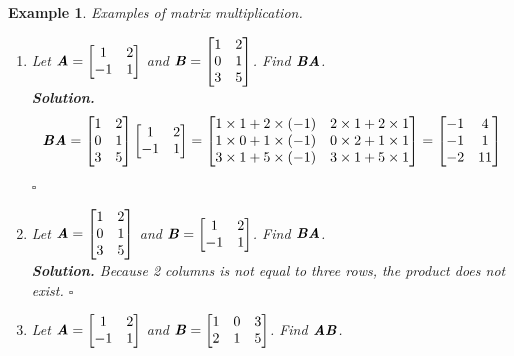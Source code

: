 \documentclass[12pt, a4paper]{article}
\newtheorem{eg}{Example}[subsection]
\newenvironment*{sol}{\indent\textbf{Solution. }}{\hfill{$\square$}\par}
\def\matrixA{\textbf{\emph{A}}}
\def\matrixB{\textbf{\emph{B}}}
\begin{document}
\begin{eg}
Examples of matrix multiplication.
\begin{enumerate}
	\item Let $\matrixA=\begin{bmatrix}1&2\\-1&1\end{bmatrix}$ and $\matrixB=\begin{bmatrix}1&2\\0&1\\3&5\end{bmatrix}$. Find $\matrixB\matrixA$.\\
	\begin{sol}\[\matrixB\matrixA=\begin{bmatrix}1&2\\0&1\\3&5\end{bmatrix}\begin{bmatrix}1&2\\-1&1\end{bmatrix}=\begin{bmatrix}1\times1+2\times(-1)&2\times1+2\times1\\1\times0+1\times(-1)&0\times2+1\times1\\3\times1+5\times(-1)&3\times1+5\times1\end{bmatrix}=\begin{bmatrix}-1&4\\-1&1\\-2&11\end{bmatrix}\]\end{sol}
	\item Let $\matrixA=\begin{bmatrix}1&2\\0&1\\3&5\end{bmatrix}$ and $\matrixB=\begin{bmatrix}1&2\\-1&1\end{bmatrix}$. Find $\matrixB\matrixA$.\\
	\begin{sol} Because 2 columns is not equal to three rows, the product does not exist. \end{sol}
	\item Let $\matrixA=\begin{bmatrix}1&2\\-1&1\end{bmatrix}$ and $\matrixB=\begin{bmatrix}1&0&3\\2&1&5\end{bmatrix}$. Find $\matrixA\matrixB$.\\

\end{enumerate}
\end{eg}
\end{document}
